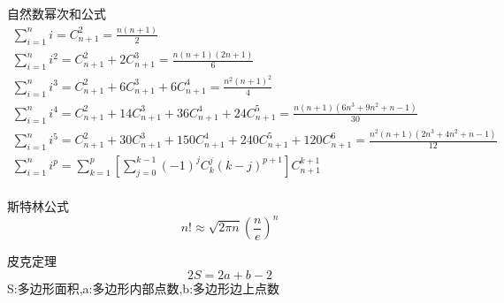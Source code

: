 
自然数幂次和公式
\begin{equation*}
    \begin{aligned}
        \sum_{i = 1}^{n}i = C_{n + 1}^{2} = \frac{n(n + 1)}{2}\\
        
        \sum_{i = 1}^{n}i^2 = C_{n + 1} ^ {2} + 2C_{n + 1} ^ {3} = \frac{n(n + 1)(2n + 1)}{6}\\
        
        \sum_{i = 1}^{n}i^3 = C_{n + 1} ^ {2} + 6C_{n + 1} ^ {3} + 6C_{n + 1} ^ {4} = \frac{n ^ 2(n + 1) ^ 2}{4}\\
        
        \sum_{i = 1}^{n}i^4 = C_{n + 1}^{2} + 14C_{n + 1}^{3} + 36C_{n + 1}^{4} + 24C_{n + 1}^{5} = \frac{n(n + 1)(6n ^ 3 + 9n ^ 2 + n - 1)}{30}\\
        
        \sum_{i = 1}^{n}i^5 = C_{n + 1} ^ {2} + 30C_{n + 1}^{3} + 150C_{n + 1}^{4} + 240C_{n + 1}^{5} + 120C_{n + 1}^{6} = \frac{n^2(n + 1)(2n^3 + 4n^2+n-1)}{12}\\
        
        \sum_{i = 1}^{n}i^p = \sum_{k = 1} ^ {p}\left[\sum_{j = 0} ^ {k - 1}(-1) ^ jC_{k} ^{j}(k - j) ^ {p + 1}\right]C_{n + 1} ^ {k + 1}\\
    \end{aligned}
\end{equation*}



斯特林公式
\[
n!\approx \sqrt{2\pi n}\left(\frac{n}{e}\right) ^ {n}
\]

皮克定理
\[
2S = 2a + b - 2
\]
S:多边形面积,a:多边形内部点数,b:多边形边上点数
